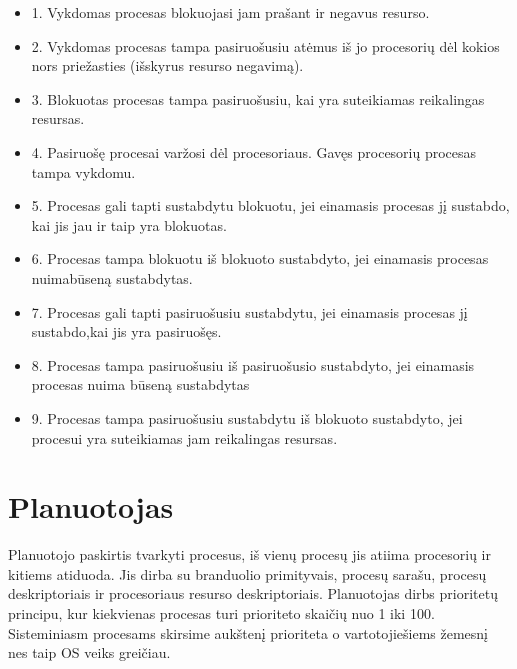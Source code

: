 \documentclass[oneside]{VUMIFPSkursinis}
\begin{document}
\begin{itemize}
	\item 1. Vykdomas procesas blokuojasi jam prašant ir negavus resurso. 
	\item 2. Vykdomas procesas tampa pasiruošusiu atėmus iš jo procesorių dėl kokios nors priežasties (išskyrus resurso negavimą). 
	\item 3. Blokuotas procesas tampa pasiruošusiu, kai yra suteikiamas reikalingas resursas. 
	\item 4. Pasiruošę procesai varžosi dėl procesoriaus. Gavęs procesorių procesas tampa vykdomu. 
	\item 5. Procesas gali tapti sustabdytu blokuotu, jei einamasis procesas jį sustabdo, kai jis jau ir taip yra blokuotas. 
	\item 6. Procesas tampa blokuotu iš blokuoto sustabdyto, jei einamasis procesas nuimabūseną sustabdytas. 
	\item 7. Procesas gali tapti pasiruošusiu sustabdytu, jei einamasis procesas jį sustabdo,kai jis yra pasiruošęs.
	\item 8. Procesas tampa pasiruošusiu iš pasiruošusio sustabdyto, jei einamasis procesas nuima būseną sustabdytas 
	\item 9. Procesas tampa pasiruošusiu sustabdytu iš blokuoto sustabdyto, jei procesui yra suteikiamas jam reikalingas resursas. 

\end{itemize}

\section{Planuotojas} Planuotojo paskirtis tvarkyti procesus, iš vienų procesų jis atiima procesorių ir kitiems atiduoda. Jis dirba su branduolio primityvais, procesų sarašu, procesų deskriptoriais ir procesoriaus resurso deskriptoriais. Planuotojas dirbs prioritetų principu, kur kiekvienas procesas turi prioriteto skaičių nuo 1 iki 100. Sisteminiasm procesams skirsime aukštenį prioriteta o vartotojiešiems žemesnį nes taip OS veiks greičiau.
\end{document}
